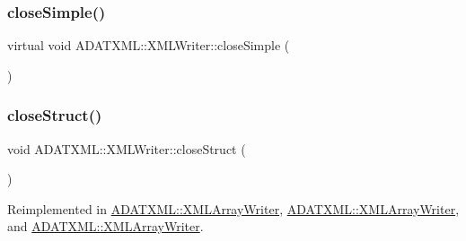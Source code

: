 \mbox{\label{classADATXML_1_1XMLWriter_a7141f35d34f4d15bbaf15d9124a4e054}} 
\subsubsection{\texorpdfstring{closeSimple()}{closeSimple()}\hspace{0.1cm}{\footnotesize\ttfamily [3/3]}}
{\footnotesize\ttfamily virtual void A\+D\+A\+T\+X\+M\+L\+::\+X\+M\+L\+Writer\+::close\+Simple (\begin{DoxyParamCaption}{ }\end{DoxyParamCaption})\hspace{0.3cm}{\ttfamily [virtual]}}

\mbox{\label{classADATXML_1_1XMLWriter_ade5512a07806893fe3aaebb897580569}} 
\subsubsection{\texorpdfstring{closeStruct()}{closeStruct()}\hspace{0.1cm}{\footnotesize\ttfamily [1/3]}}
{\footnotesize\ttfamily void A\+D\+A\+T\+X\+M\+L\+::\+X\+M\+L\+Writer\+::close\+Struct (\begin{DoxyParamCaption}{ }\end{DoxyParamCaption})\hspace{0.3cm}{\ttfamily [virtual]}}



Reimplemented in \mbox{\hyperlink{classADATXML_1_1XMLArrayWriter_a5a849f8851bce99654c44dc08b1fe486}{A\+D\+A\+T\+X\+M\+L\+::\+X\+M\+L\+Array\+Writer}}, \mbox{\hyperlink{classADATXML_1_1XMLArrayWriter_a5a849f8851bce99654c44dc08b1fe486}{A\+D\+A\+T\+X\+M\+L\+::\+X\+M\+L\+Array\+Writer}}, and \mbox{\hyperlink{classADATXML_1_1XMLArrayWriter_a5a849f8851bce99654c44dc08b1fe486}{A\+D\+A\+T\+X\+M\+L\+::\+X\+M\+L\+Array\+Writer}}.

